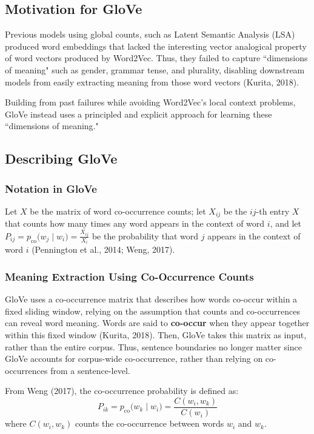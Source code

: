 \subsection{Motivation for GloVe}

Previous models using global counts, such as Latent Semantic Analysis (LSA) produced word embeddings that lacked the interesting vector analogical property of word vectors produced by Word2Vec. Thus, they failed to capture ``dimensions of meaning" such as gender, grammar tense, and plurality, disabling downstream models from easily extracting meaning from those word vectors (Kurita, 2018). 

Building from past failures while avoiding Word2Vec's local context problems, GloVe instead uses a principled and explicit approach for learning these ``dimensions of meaning."


\subsection{Describing GloVe}

\subsubsection{Notation in GloVe}

Let $X$ be the matrix of word co-occurrence counts; let $X_{ij}$ be the $ij$-th entry $X$ that counts how many times any word appears in the context of word $i$, and let $P_{ij} = p_{\text{co}} \Big(w_j \; | \; w_i \Big) = \frac {X_{ij}} {X_i}$ be the probability that word $j$ appears in the context of word $i$ (Pennington et al., 2014; Weng, 2017).

\subsubsection{Meaning Extraction Using Co-Occurrence Counts}

GloVe uses a co-occurrence matrix that describes how words co-occur within a fixed sliding window, relying on the assumption that counts and co-occurrences can reveal word meaning. Words are said to \textbf{co-occur} when they appear together within this fixed window (Kurita, 2018). Then, GloVe takes this matrix as input, rather than the entire corpus. Thus, sentence boundaries no longer matter since GloVe accounts for corpus-wide co-occurrence, rather than relying on co-occurrences from a sentence-level.

From Weng (2017), the co-occurrence probability is defined as: 
$$
P_{ik} = p_{\text{co}} \Big(w_k \; | \; w_i \Big) = \frac{C(w_i, w_k)}{C(w_i)}
$$
where $C(w_i, w_k)$ counts the co-occurrence between words $w_i$ and $w_k$. 


